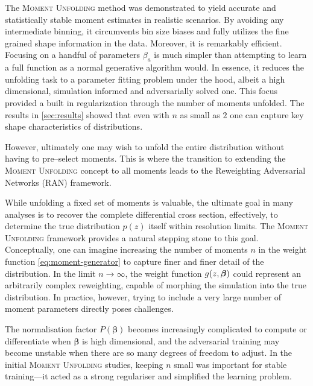 {{        The \textsc{Moment Unfolding} method was demonstrated to yield accurate and statistically stable moment estimates in realistic scenarios.
        By avoiding any intermediate binning, it circumvents bin size biases and fully utilizes the fine grained shape information in the data.
        Moreover, it is remarkably efficient.
        Focusing on a handful of parameters $\beta_a$ is much simpler than attempting to learn a full function as a normal generative algorithm would.
        In essence, it reduces the unfolding task to a parameter fitting problem under the hood, albeit a high dimensional, simulation informed and adversarially solved one. This focus provided a built in regularization through the number of moments unfolded.
        The results in \cref{sec:results} showed that even with $n$ as small as \(2\) one can capture key shape characteristics of distributions.
        
        However, ultimately one may wish to unfold the entire distribution without having to pre--select moments.
        This is where the transition to extending the \textsc{Moment Unfolding} concept to all moments leads to the Reweighting Adversarial Networks (RAN) framework.

        While unfolding a fixed set of moments is valuable, the ultimate goal in many analyses is to recover the complete differential cross section, effectively, to determine the true distribution $p(z)$ itself within resolution limits.
        The \textsc{Moment Unfolding} framework provides a natural stepping stone to this goal. Conceptually, one can imagine increasing the number of moments $n$ in the weight function \cref{eq:moment-generator} to capture finer and finer detail of the distribution.
        In the limit $n \to \infty$, the weight function $g(z, \vb*\beta)$ could represent an arbitrarily complex reweighting, capable of morphing the simulation into the true distribution.
        In practice, however, trying to include a very large number of moment parameters directly poses challenges.
        
        The normalisation factor $P(\boldsymbol{\beta})$ becomes increasingly complicated to compute or differentiate when $\boldsymbol{\beta}$ is high dimensional, and the adversarial training may become unstable when there are so many degrees of freedom to adjust.
        In the initial \textsc{Moment Unfolding} studies, keeping $n$ small was important for stable training---it acted as a strong regulariser and simplified the learning problem.
        
}}
